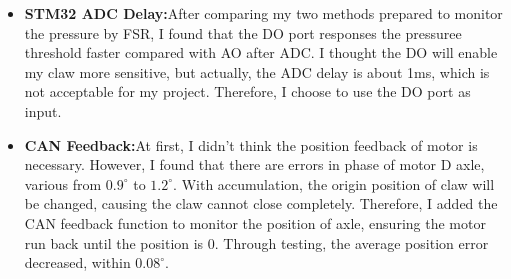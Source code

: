 \begin{itemize}
    \item \textbf{STM32 ADC Delay:}After comparing my two methods prepared to monitor the pressure by FSR, I found that the DO port responses the pressuree threshold faster compared with AO after ADC. I thought the DO will enable my claw more sensitive, but actually, the ADC delay is about 1ms, which is not acceptable for my project. Therefore, I choose to use the DO port as input.
    \item \textbf{CAN Feedback:}At first, I didn't think the position feedback of motor is necessary. However, I found that there are errors in phase of motor D axle, various from $0.9^\circ$ to $1.2^\circ$. With accumulation, the origin position of claw will be changed, causing the claw cannot close completely. Therefore, I added the CAN feedback function to monitor the position of axle, ensuring the motor run back until the position is 0. Through testing, the average position error decreased, within $0.08^\circ$. 
\end{itemize}


